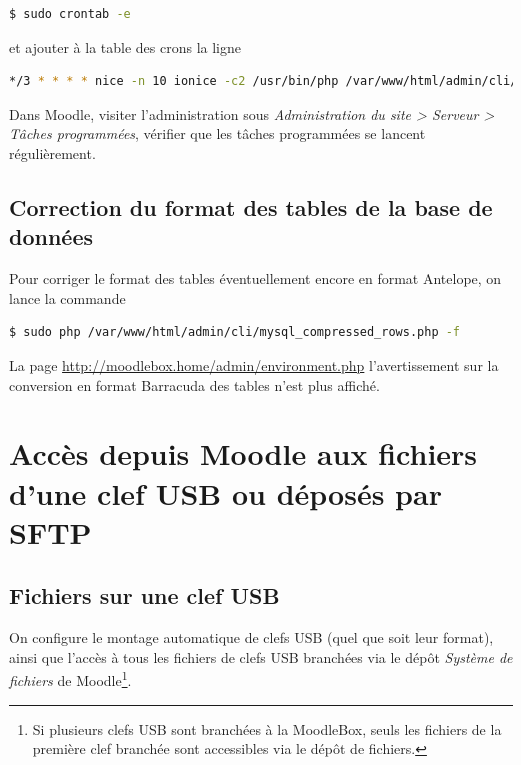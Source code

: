 \documentclass[11pt]{article}
\begin{document}
\begin{lstlisting}[language=bash]
$ sudo crontab -e
\end{lstlisting}

et ajouter à la table des crons la ligne
\begin{lstlisting}[language=bash]
*/3 * * * * nice -n 10 ionice -c2 /usr/bin/php /var/www/html/admin/cli/cron.php
\end{lstlisting}

\begin{verification}
Dans Moodle, visiter l'administration sous \emph{Administration du site > Serveur > Tâches programmées}, vérifier que les tâches programmées se lancent régulièrement.
\end{verification}

\subsection{Correction du format des tables de la base de données}

Pour corriger le format des tables éventuellement encore en format Antelope, on lance la commande

\begin{lstlisting}[language=bash]
$ sudo php /var/www/html/admin/cli/mysql_compressed_rows.php -f
\end{lstlisting}

\begin{verification}
La page \url{http://moodlebox.home/admin/environment.php} l'avertissement sur la conversion en format Barracuda des tables n'est plus affiché.
\end{verification}

\section{Accès depuis Moodle aux fichiers d'une clef USB ou déposés par SFTP}

\subsection{Fichiers sur une clef USB}

On configure le montage automatique de clefs USB (quel que soit leur format), ainsi que l'accès à tous les fichiers de clefs USB branchées via le dépôt \emph{Système de fichiers} de Moodle\footnote{Si plusieurs clefs USB sont branchées à la MoodleBox, seuls les fichiers de la première clef branchée sont accessibles via le dépôt de fichiers.}.
\end{document}
